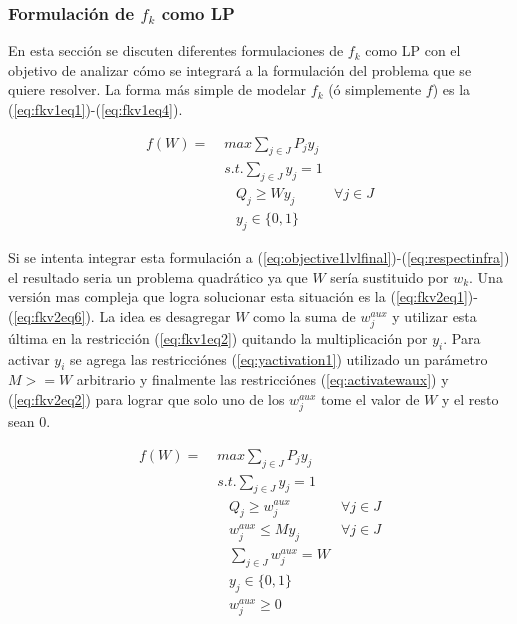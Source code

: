 \documentclass{article}
\begin{document}
  \subsubsection*{Formulación de $f_k$ como LP}

  En esta sección se discuten diferentes formulaciones de $f_k$ como LP con el objetivo de analizar cómo se integrará a la formulación del problema que se quiere resolver. La forma más simple de modelar $f_k$ (ó simplemente $f$) es la (\ref{eq:fkv1eq1})-(\ref{eq:fkv1eq4}).

  \begin{align}
    f(W) =\; & max \sum_{j \in J} P_j y_j    & \label{eq:fkv1eq1}\\
             & s.t. \sum_{j \in J} y_j = 1   & \label{eq:fkv1eq2} \\
             & \;\;\; Q_j \geq W y_j         & \forall j \in J \\
             & \;\;\; y_j \in \{0,1\}        & \label{eq:fkv1eq4}
  \end{align}

  Si se intenta integrar esta formulación a (\ref{eq:objective1lvlfinal})-(\ref{eq:respectinfra}) el resultado seria un problema quadrático ya que $W$ sería sustituido por $w_k$. Una versión mas compleja que logra solucionar esta situación es la (\ref{eq:fkv2eq1})-(\ref{eq:fkv2eq6}). La idea es desagregar $W$ como la suma de $w^{aux}_j$ y utilizar esta última en la restricción (\ref{eq:fkv1eq2}) quitando la multiplicación por $y_i$. Para activar $y_i$ se agrega las restricciónes (\ref{eq:yactivation1}) utilizado un parámetro $M >= W$ arbitrario y finalmente las restricciónes (\ref{eq:activatewaux}) y (\ref{eq:fkv2eq2}) para lograr que solo uno de los $w^{aux}_j$ tome el valor de $W$ y el resto sean 0.

  \begin{align}
    f(W) =\; & max \sum_{j \in J} P_j y_j             & \label{eq:fkv2eq1}\\
             & s.t. \sum_{j \in J} y_j = 1            & \label{eq:fkv2eq2}\\
             & \;\;\; Q_j \geq w^{aux}_j              & \forall j \in J \label{eq:implfkoriginalineq} \\
             & \;\;\; w^{aux}_j \leq M y_j            & \forall j \in J \label{eq:yactivation1} \\
             & \;\;\; \sum_{j \in J} w^{aux}_j = W    & \label{eq:activatewaux} \\
             & \;\;\; y_j \in \{0,1\}                 & \label{eq:fkv2domainy} \\
             & \;\;\; w^{aux}_j \geq 0                & \label{eq:fkv2eq6}
  \end{align}
\end{document}
